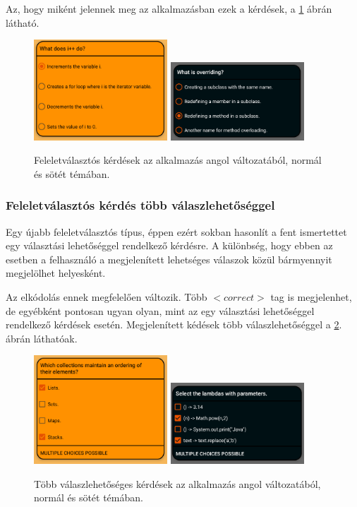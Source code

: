 \documentclass[12pt,a4paper]{article}
\begin{document}
	Az, hogy miként jelennek meg az alkalmazásban ezek a kérdések, a \ref{question_single_choice_figure} ábrán látható.
	
	\begin{figure}[h!]
		\centering
		\includegraphics[width=5cm]{question_single_choice}
		\includegraphics[width=5cm]{question_single_choice_dark}
		\caption{Feleletválasztós kérdések az alkalmazás angol változatából, normál és sötét témában.}
		\label{question_single_choice_figure}
	\end{figure}
	
	\subsubsection{Feleletválasztós kérdés több válaszlehetőséggel}
	
	Egy újabb feleletválasztós típus, éppen ezért sokban hasonlít a fent ismertettet egy választási lehetőséggel rendelkező kérdésre. A különbség, hogy ebben az esetben a felhasználó a megjelenített lehetséges válaszok közül bármyennyit megjelölhet helyesként.
	
	Az elkódolás ennek megfelelően változik. Több $<correct>$ tag is megjelenhet, de egyébként pontosan ugyan olyan, mint az egy választási lehetőséggel rendelkező kérdések esetén. Megjelenített kédések több válaszlehetőséggel a \ref{question_multi_choice_figure}. ábrán láthatóak.
	
 	\begin{figure}[h!]
 		\centering
 		\includegraphics[width=5cm]{question_multi_choice}
 		\includegraphics[width=5cm]{question_multi_choice_dark}
 		\caption{Több válaszlehetőséges kérdések az alkalmazás angol változatából, normál és sötét témában.}
 		\label{question_multi_choice_figure}
	 \end{figure}
	
\end{document}

